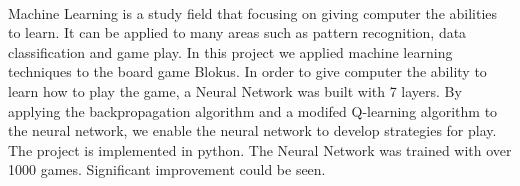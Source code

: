 \documentclass{report}
\begin{document}
	\\
	Machine Learning is a study field that focusing on giving computer the abilities to learn. It can be applied to many areas such as pattern recognition, data classification and game play. 
	In this project we applied machine learning techniques to the board game Blokus. In order to give computer the ability to learn how to play the game, a Neural Network was built with 7 layers.
	By applying the backpropagation algorithm and a modifed Q-learning algorithm to the neural network, we enable the neural network to develop strategies for play. The project is implemented
	in python. The Neural Network was trained with over 1000 games. Significant improvement could be seen.\\ \\
\end{document}
